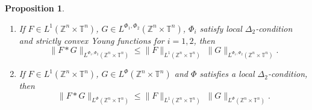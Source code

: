 \documentclass[a4paper,11pt, reqno]{amsart}
\theoremstyle{plain}
\newtheorem{proposition}[theorem]{Proposition}
\theoremstyle{definition}
\theoremstyle{remark}
\def \Z{{\mathbb Z}}
\def \T{{\mathbb T}}
\begin{document}
\begin{proposition}\label{pro6}
\begin{enumerate}
\item If $F \in L^1(\Z^n \times \T^n)$, $G \in L^{\Phi_1, \Phi_2} (\Z^n \times \T^n)$, $\Phi_i$ satisfy local $\Delta_2$-condition and strictly convex Young functions for $i = 1, 2$, then
\begin{equation}\label{eq02}
\|F * G\|_{L^{\Phi_1, \Phi_2} (\Z^n \times \T^n)} \leq \|F\|_{L^1(\Z^n \times \T^n)} \; \|G\|_{L^{\Phi_1, \Phi_2} (\Z^n \times \T^n)}.
\end{equation}

\item If $F \in L^{1}(\Z^n \times \T^n)$,  $G \in L^{\Phi} (\Z^n \times \T^n)$ and $\Phi$ satisfies a local $\Delta_2$-condition, then
\begin{equation}\label{eq01}
\|F * G\|_{L^{\Phi} (\Z^n \times \T^n)} \leq \|F\|_{L^1(\Z^n \times \T^n)} \; \|G\|_{L^{\Phi} (\Z^n \times \T^n)}.
\end{equation}
\end{enumerate}
\end{proposition}
\end{document}

